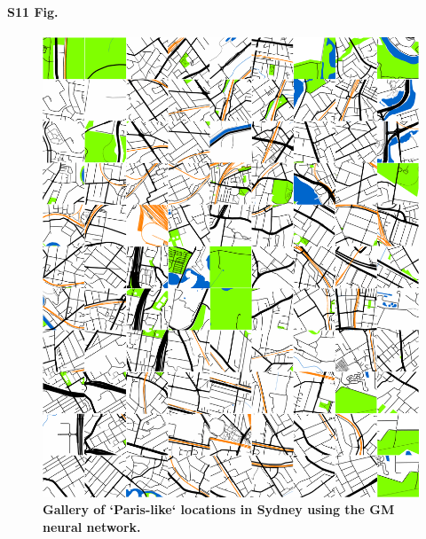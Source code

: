 \documentclass[10pt,letterpaper]{article}
\begin{document}
\paragraph*{S11 Fig.}
\begin{figure}[!htbp]
\centering   
\includegraphics[scale=0.12]{Images/PlosOne/Fig11.png}   
\caption{\bf Gallery of `Paris-like` locations in Sydney using the GM neural network.}    
 \label{fig:gm_syd_gallery}  
\end{figure} 
\end{document}
